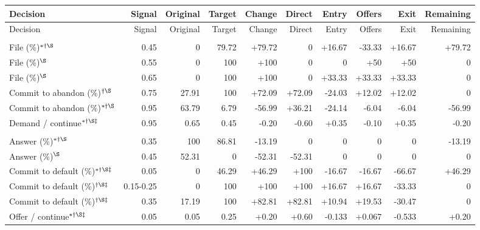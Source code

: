 \documentclass[10pt]{article}
\begin{document}
{\small\setlength{\tabcolsep}{3pt}\begin{longtable}{@{}>{\raggedright\arraybackslash}p{1.65in}rrrrrrrrr@{}}
\toprule Decision & Signal & Original & Target & Change & Direct & Entry & Offers & Exit & Remaining \\\midrule\endfirsthead
\toprule Decision & Signal & Original & Target & Change & Direct & Entry & Offers & Exit & Remaining \\\midrule\endhead
\bottomrule\endfoot
\multicolumn{10}{@{}l}{\textbf{Plaintiff}}\\
File (\%)$^{*\dagger\S}$ & 0.45 & 0 & 79.72 & +79.72 & 0 & +16.67 & -33.33 & +16.67 & +79.72\\
File (\%)$^{\S}$ & 0.55 & 0 & 100 & +100 & 0 & 0 & +50 & +50 & 0\\
File (\%)$^{\S}$ & 0.65 & 0 & 100 & +100 & 0 & +33.33 & +33.33 & +33.33 & 0\\
Commit to abandon (\%)$^{\dagger\S}$ & 0.75 & 27.91 & 100 & +72.09 & +72.09 & -24.03 & +12.02 & +12.02 & 0\\
Commit to abandon (\%)$^{*\dagger\S}$ & 0.95 & 63.79 & 6.79 & -56.99 & +36.21 & -24.14 & -6.04 & -6.04 & -56.99\\
Demand / continue$^{*\dagger\S\ddagger}$ & 0.95 & 0.65 & 0.45 & -0.20 & -0.60 & +0.35 & -0.10 & +0.35 & -0.20\\
\multicolumn{10}{@{}l}{\textbf{Defendant}}\\
Answer (\%)$^{*\dagger\S}$ & 0.35 & 100 & 86.81 & -13.19 & 0 & 0 & 0 & 0 & -13.19\\
Answer (\%)$^{\S}$ & 0.45 & 52.31 & 0 & -52.31 & -52.31 & 0 & 0 & 0 & 0\\
Commit to default (\%)$^{*\dagger\S\ddagger}$ & 0.05 & 0 & 46.29 & +46.29 & +100 & -16.67 & -16.67 & -66.67 & +46.29\\
Commit to default (\%)$^{\dagger\S\ddagger}$ & 0.15-0.25 & 0 & 100 & +100 & +100 & +16.67 & +16.67 & -33.33 & 0\\
Commit to default (\%)$^{\dagger\S\ddagger}$ & 0.35 & 17.19 & 100 & +82.81 & +82.81 & +10.94 & +19.53 & -30.47 & 0\\
Offer / continue$^{*\dagger\S\ddagger}$ & 0.05 & 0.05 & 0.25 & +0.20 & +0.60 & -0.133 & +0.067 & -0.533 & +0.20\\
\end{longtable}}
\end{document}
